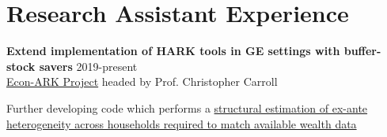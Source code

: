 
\section{Research Assistant Experience} %
\label{sec:research_exper}
\vspace{-0.25in}
\begin{outerlist}

\item {\bf Extend implementation of HARK tools in GE settings with buffer-stock savers} \hfill 2019-present\\
	\href{https://econ-ark.org}{Econ-ARK Project} headed by Prof. Christopher Carroll
	\begin{innerlist}
		\item Further developing code which performs a \href{https://github.com/econ-ark/DistributionOfWealthMPC}{structural estimation of ex-ante heterogeneity across households required to match available wealth data}
		
	\end{innerlist}
	
\end{outerlist}